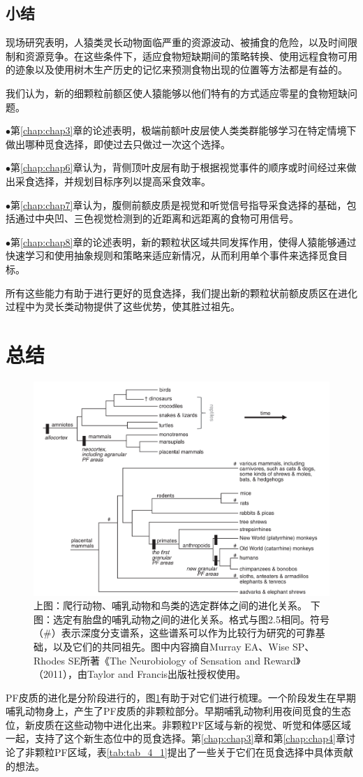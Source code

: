 \subsection{小结}
现场研究表明，人猿类灵长动物面临严重的资源波动、被捕食的危险，以及时间限制和资源竞争。在这些条件下，适应食物短缺期间的策略转换、使用远程食物可用的迹象以及使用树木生产历史的记忆来预测食物出现的位置等方法都是有益的。

我们认为，新的细颗粒前额区使人猿能够以他们特有的方式适应零星的食物短缺问题。\par
$\bullet$第\ref{chap:chap3}章的论述表明，极端前额叶皮层使人类类群能够学习在特定情境下做出哪种觅食选择，即使过去只做过一次这个选择。\par
$\bullet$第\ref{chap:chap6}章认为，背侧顶叶皮层有助于根据视觉事件的顺序或时间经过来做出采食选择，并规划目标序列以提高采食效率。\par
$\bullet$第\ref{chap:chap7}章认为，腹侧前额皮质是视觉和听觉信号指导采食选择的基础，包括通过中央凹、三色视觉检测到的近距离和远距离的食物可用信号。\par
$\bullet$第\ref{chap:chap8}章的论述表明，新的颗粒状区域共同发挥作用，使得人猿能够通过快速学习和使用抽象规则和策略来适应新情况，从而利用单个事件来选择觅食目标。

所有这些能力有助于进行更好的觅食选择，我们提出新的颗粒状前额皮质区在进化过程中为灵长类动物提供了这些优势，使其胜过祖先。

\section{总结}
\begin{figure}[!htb]
	\centering
	\includegraphics[width=0.8\linewidth]{image_pfc/Fig_2_8}
	\caption*{上图：爬行动物、哺乳动物和鸟类的选定群体之间的进化关系。 下图：选定有胎盘的哺乳动物之间的进化关系。格式与图2.5相同。符号（\#）表示深度分支谱系，这些谱系可以作为比较行为研究的可靠基础，以及它们的共同祖先。图中内容摘自Murray EA、Wise SP、Rhodes SE所著《The Neurobiology of Sensation and Reward》（2011），由Taylor and Francis出版社授权使用。\label{fig:fig_2_8}}
\end{figure}
PF皮质的进化是分阶段进行的，图\ref{fig:fig_2_8}有助于对它们进行梳理。一个阶段发生在早期哺乳动物身上，产生了PF皮质的非颗粒部分。早期哺乳动物利用夜间觅食的生态位，新皮质在这些动物中进化出来。非颗粒PF区域与新的视觉、听觉和体感区域一起，支持了这个新生态位中的觅食选择。第\ref{chap:chap3}章和第\ref{chap:chap4}章讨论了非颗粒PF区域，表\ref{tab:tab_4_1}提出了一些关于它们在觅食选择中具体贡献的想法。

